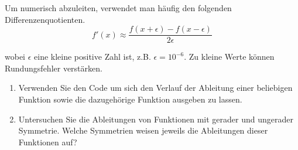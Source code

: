 \begin{ExerciseBlock}
Um numerisch abzuleiten, verwendet man häufig den folgenden Differenzenquotienten.
\begin{equation*}
	f'(x) \approx \frac{ f(x + \epsilon) - f(x - \epsilon) }{2 \epsilon}
\end{equation*}

wobei $\epsilon$ eine kleine positive Zahl ist, z.B. $\epsilon = 10^{-6}$. Zu kleine Werte können Rundungsfehler verstärken.

\begin{enumerate}[label=\alph*)]

\item Verwenden Sie den Code um sich den Verlauf der Ableitung einer beliebigen Funktion sowie die dazugehörige Funktion ausgeben zu lassen.

\item Untersuchen Sie die Ableitungen von Funktionen mit gerader und ungerader Symmetrie. Welche Symmetrien weisen jeweils die Ableitungen dieser Funktionen auf?

\end{enumerate}
\end{ExerciseBlock}
